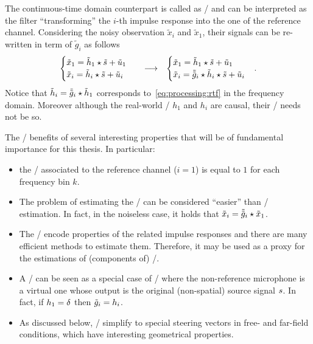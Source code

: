 The continuous-time domain counterpart is called as \ReIRdef/ and can be interpreted as the filter ``transforming'' the $i$-th impulse response into the one of the reference channel.
Considering the noisy observation $\tilde{x}_i$ and $\tilde{x}_1$, their signals can be re-written in term of $\tilde{g}_i$ as follows
\begin{equation}
    \begin{matrix}
    \begin{cases}
        \tilde{x}_1 = \tilde{h}_1 \star \tilde{s} + \tilde{u}_1 \\
        \tilde{x}_i = \tilde{h}_i \star \tilde{s} + \tilde{u}_i
    \end{cases} & \longrightarrow  & \begin{cases}
        \tilde{x}_1 = \tilde{h}_1 \star \tilde{s} + \tilde{u}_1 \\
        \tilde{x}_i = \tilde{\tilde{g}}_i \star \tilde{h}_i \star \tilde{s} + \tilde{u}_i
    \end{cases}
    \end{matrix}
    .
\end{equation}
Notice that $\tilde{h}_i = \tilde{\tilde{g}}_i \star \tilde{h}_1$ corresponds to~\cref{eq:processing:rtf} in the frequency domain.
Moreover although the real-world \RIRs/ $h_1$ and $h_i$ are causal, their \RTF/ needs not be so.

The \RTFs/ benefits of several interesting properties that will be of fundamental importance for this thesis.
In particular:
\begin{itemize}
    \item the \RTF/ associated to the reference channel ($i = 1$) is equal to $1$ for each frequency bin $k$.
    \item The problem of estimating the \RTF/ can be considered ``easier'' than \RIRs/ estimation.
    In fact, in the noiseless case, it holds that $\tilde{x}_i = \tilde{\tilde{g}}_i \star \tilde{x}_1$.
    \item The \RTFs/ encode properties of the related impulse responses and there are many efficient methods to estimate them.
    Therefore, it may be used as a proxy for the estimations of (components of) \RIRs/.
    \item A \RIR/ can be seen as a special case of \RTF/ where the non-reference microphone is a virtual one whose
    output is the original (non-spatial) source signal $s$. In fact, if $h_1 = \delta$ then $\tilde{g}_i = h_i$.
    \item As discussed below, \RTFs/ simplify to special steering vectors in free- and far-field conditions, which have interesting geometrical properties.
\end{itemize}

